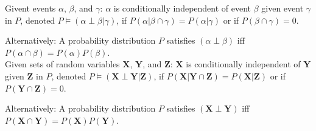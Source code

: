 {%
  Givent events $\alpha$, $\beta$, and $\gamma$: $\alpha$ is conditionally independent of event $\beta$ given event $\gamma$ in $P$, denoted $P\models(\alpha\perp\beta|\gamma)$, if $P(\alpha|\beta\cap\gamma)=P(\alpha|\gamma)$ or if $P(\beta\cap\gamma)=0$.

  Alternatively: A \gls{probability distribution} $P$ satisfies $(\alpha\perp\beta)$ \acrshort{iff} $P(\alpha\cap\beta)=P(\alpha)P(\beta)$.\\[0.1cm]

  Given sets of random variables $\bm{X}$, $\bm{Y}$, and $\bm{Z}$: $\bm{X}$ is conditionally independent of $\bm{Y}$ given $\bm{Z}$ in $P$, denoted $P\models(\bm{X}\perp\bm{Y}|\bm{Z})$, if $P(\bm{X}|\bm{Y}\cap\bm{Z})=P(\bm{X}|\bm{Z})$ or if $P(\bm{Y}\cap\bm{Z})=0$.

  Alternatively: A \gls{probability distribution} $P$ satisfies $(\bm{X}\perp\bm{Y})$ \acrshort{iff} $P(\bm{X}\cap\bm{Y})=P(\bm{X})P(\bm{Y})$.
}

